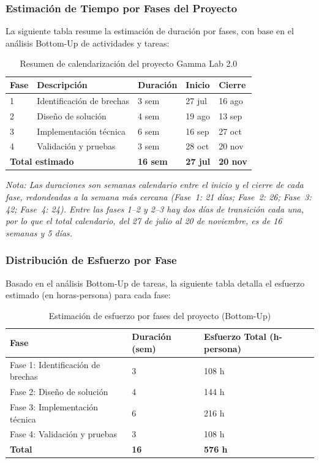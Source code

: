 \documentclass{article}
\begin{document}
\subsubsection{Estimación de Tiempo por Fases del Proyecto}

La siguiente tabla resume la estimación de duración por fases, con base en el análisis Bottom-Up de actividades y tareas:

\begin{table}[H]
\centering
\small
\begin{tabular}{|p{2cm}|p{3cm}|p{2cm}|p{2cm}|p{2cm}|}
\hline
\textbf{Fase} & \textbf{Descripción} & \textbf{Duración} & \textbf{Inicio} & \textbf{Cierre} \\
\hline
1 & Identificación de brechas & 3 sem & 27 jul & 16 ago \\
\hline
2 & Diseño de solución & 4 sem & 19 ago & 13 sep \\
\hline
3 & Implementación técnica & 6 sem & 16 sep & 27 oct \\
\hline
4 & Validación y pruebas & 3 sem & 28 oct & 20 nov \\
\hline
\multicolumn{2}{|l|}{\textbf{Total estimado}} & \textbf{16 sem} & \textbf{27 jul} & \textbf{20 nov} \\
\hline
\end{tabular}
\caption{Resumen de calendarización del proyecto Gamma Lab 2.0}
\label{tab:calendario}
\end{table}

\textit{Nota: Las duraciones son semanas calendario entre el inicio y el cierre de cada fase, redondeadas a la semana más cercana (Fase~1: 21 días; Fase~2: 26; Fase~3: 42; Fase~4: 24). Entre las fases 1--2 y 2--3 hay dos días de transición cada una, por lo que el total calendario, del 27 de julio al 20 de noviembre, es de 16 semanas y 5 días.}

\subsubsection{Distribución de Esfuerzo por Fase}

Basado en el análisis Bottom-Up de tareas, la siguiente tabla detalla el esfuerzo estimado (en horas-persona) para cada fase:

\begin{table}[H]
\centering
\small
\begin{tabular}{|p{3.5cm}|p{2.5cm}|p{3cm}|}
\hline
\textbf{Fase} & \textbf{Duración (sem)} & \textbf{Esfuerzo Total (h-persona)} \\
\hline
Fase 1: Identificación de brechas & 3 & 108 h \\
\hline
Fase 2: Diseño de solución & 4 & 144 h \\
\hline
Fase 3: Implementación técnica & 6 & 216 h \\
\hline
Fase 4: Validación y pruebas & 3 & 108 h \\
\hline
\textbf{Total} & \textbf{16} & \textbf{576 h} \\
\hline
\end{tabular}
\caption{Estimación de esfuerzo por fases del proyecto (Bottom-Up)}
\label{tab:esfuerzo}
\end{table}
\end{document}
